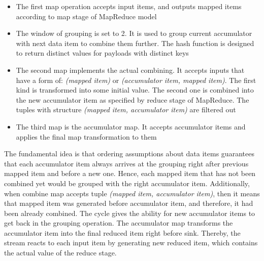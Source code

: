 \begin{itemize}
  \item The first map operation accepts input items, and outputs mapped items according to map stage of MapReduce model
  \item The window of grouping is set to 2. It is used to group current accumulator with next data item to combine them further. The hash function is designed to return distinct values for payloads with distinct keys
  \item The second map implements the actual combining. It accepts inputs that have a form of: \textit{(mapped item)} or \textit{(accumulator item, mapped item)}. The first kind is transformed into some initial value. The second one is combined into the new accumulator item as specified by reduce stage of MapReduce. The tuples with structure \textit{(mapped item, accumulator item)} are filtered out
  \item The third map is the accumulator map. It accepts accumulator items and applies the final map transformation to them
\end{itemize}

The fundamental idea is that ordering assumptions about data items guarantees that each accumulator item always arrives at the grouping right after previous mapped item and before a new one. Hence, each mapped item that has not been combined yet would be grouped with the right accumulator item. Additionally, when combine map accepts tuple {\it (mapped item, accumulator item)}, then it means that mapped item was generated before accumulator item, and therefore, it had been already combined. The cycle gives the ability for new accumulator items to get back in the grouping operation. The accumulator map transforms the accumulator item into the final reduced item right before sink. Thereby, the stream reacts to each input item by generating new reduced item, which contains the actual value of the reduce stage.



